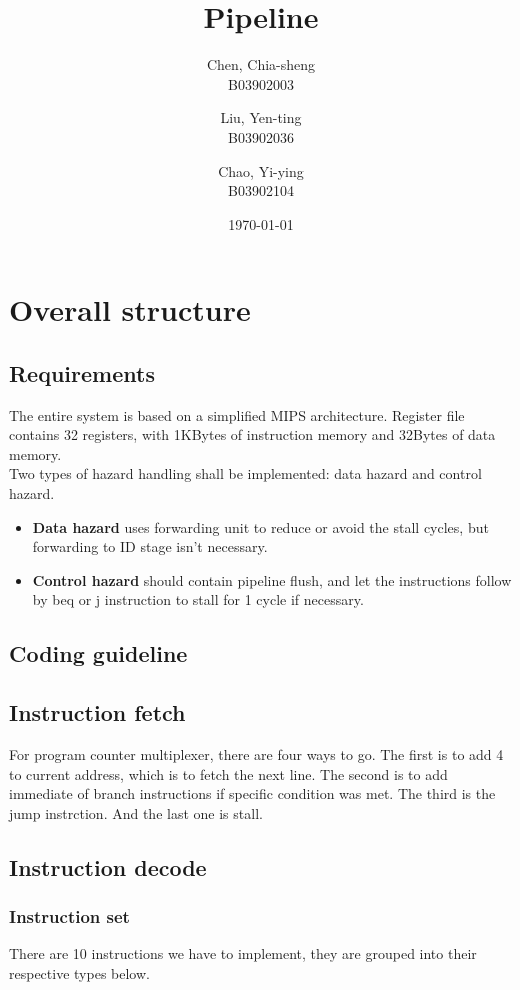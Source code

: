 \documentclass[11pt, a4paper, twoside]{article}
\title
{
	Pipeline
}
\author
{
  Chen, Chia-sheng\\
  B03902003
  \and
  Liu, Yen-ting\\
  B03902036
  \and
  Chao, Yi-ying\\
  B03902104
}
\date{\today}
\begin{document}
\maketitle

\section{Overall structure}

\subsection{Requirements}
The entire system is based on a simplified MIPS architecture. Register file contains 32 registers, with 1KBytes of instruction memory and 32Bytes of data memory.\\

Two types of hazard handling shall be implemented: data hazard and control hazard.
\begin{itemize}
\item \textbf{Data hazard} uses {\sc forwarding unit} to reduce or avoid the stall cycles, but forwarding to {\sc ID} stage isn't necessary. 
\item \textbf{Control hazard} should contain pipeline flush, and let the instructions follow by beq or j instruction to stall for 1 cycle if necessary.
\end{itemize}


\subsection{Coding guideline}

\subsection{Instruction fetch}
For program counter multiplexer, there are four ways to go. The first is to add 4 to current address, which is to fetch the next line. The second is to add immediate of branch instructions if specific condition was met. The third is the jump instrction. And the last one is stall.
\subsection{Instruction decode}
\subsubsection{Instruction set}
There are 10 instructions we have to implement, they are grouped into their respective types below. 
\end{document}
